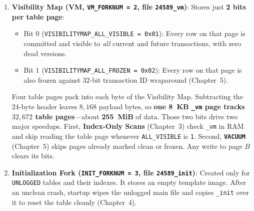 \begin{enumerate}
  \item \textbf{Visibility Map (VM, \texttt{VM\_FORKNUM = 2}, file \texttt{24589\_vm})}: Stores just \textbf{2 bits per table page}:
  \begin{itemize}
    \item Bit 0 (\texttt{VISIBILITYMAP\_ALL\_VISIBLE = 0x01}): Every row on that page is committed and visible to \emph{all} current and future transactions, with zero dead versions.
    \item Bit 1 (\texttt{VISIBILITYMAP\_ALL\_FROZEN = 0x02}): Every row on that page is also frozen against 32-bit transaction ID wraparound (Chapter~5).
  \end{itemize}
  Four table pages pack into each byte of the Visibility Map. Subtracting the 24-byte header leaves $8{,}168$ payload bytes, so \textbf{one 8~KB \texttt{\_vm} page tracks $32{,}672$ table pages}---about \textbf{255~MiB} of data. Those two bits drive two major speedups. First, \textbf{Index-Only Scans} (Chapter~3) check \texttt{\_vm} in RAM and skip reading the table page whenever \texttt{ALL\_VISIBLE} is \texttt{1}. Second, \textbf{\texttt{VACUUM}} (Chapter~5) skips pages already marked clean or frozen. Any write to page $B$ clears its bits.

  \item \textbf{Initialization Fork (\texttt{INIT\_FORKNUM = 3}, file \texttt{24589\_init})}: Created only for \texttt{UNLOGGED} tables and their indexes. It stores an empty template image. After an unclean crash, startup wipes the unlogged main file and copies \texttt{\_init} over it to reset the table cleanly (Chapter~4).
\end{enumerate}

